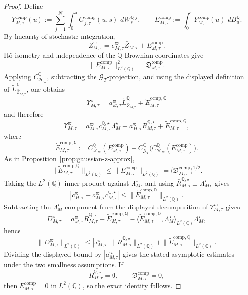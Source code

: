 \documentclass[11pt,a4paper]{amsart}
\theoremstyle{plain}
\theoremstyle{definition}
\theoremstyle{remark}
\newcommand{\QQ}{\mathbb{Q}}
\newcommand{\cG}{\mathcal{G}}
\newcommand{\cH}{\mathcal{H}}
\newcommand{\dd}{\,d}
\begin{document}
\begin{proof}
Define
\[
        Y_{M,\tau}^{\mathrm{comp}}(u)
        :=
        \sum_{j=1}^N \int_0^u G_{j,\tau}^{\mathrm{comp}}(u,s)\,\dd W_s^{\QQ,j},
        \qquad
        E_{M,\tau}^{\mathrm{comp}}
        :=
        \int_0^\tau Y_{M,\tau}^{\mathrm{comp}}(u)\,\dd B_u^\QQ.
\]
By linearity of stochastic integration,
\[
        Z_{M,\tau}^\varpi
        =
        a_{M,\tau}^\varpi \bar Z_{M,\tau}
        +
        E_{M,\tau}^{\mathrm{comp}}.
\]
It\^o isometry and independence of the \(\QQ\)-Brownian coordinates give
\[
        \|E_{M,\tau}^{\mathrm{comp}}\|_{L^2(\QQ)}^2
        =
        \mathfrak D_{M,\tau}^{\mathrm{comp}}.
\]
Applying \(C_{\cH_\varpi}^\QQ\), subtracting the \(\cG_T\)-projection, and using the displayed
definition of \(\widetilde L_{\bar Z_{M,\tau}}^\QQ\), one obtains
\[
        \Upsilon_{M,\tau}^\varpi
        =
        a_{M,\tau}^\varpi \widetilde L_{\bar Z_{M,\tau}}^\QQ
        +
        \widetilde E_{M,\tau}^{\mathrm{comp},\QQ}
\]
and therefore
\[
        \Upsilon_{M,\tau}^\varpi
        =
        a_{M,\tau}^\varpi \bar c_{M,\tau}^{\QQ,\star}\Lambda_M^\star
        +
        a_{M,\tau}^\varpi \bar R_{M,\tau}^{\QQ,\star}
        +
        \widetilde E_{M,\tau}^{\mathrm{comp},\QQ},
\]
where
\[
        \widetilde E_{M,\tau}^{\mathrm{comp},\QQ}
        :=
        C_{\cH_\varpi}^\QQ(E_{M,\tau}^{\mathrm{comp}})
        -
        C_{\cG_T}^\QQ\bigl(C_{\cH_\varpi}^\QQ(E_{M,\tau}^{\mathrm{comp}})\bigr).
\]
As in Proposition~\ref{prop:gaussian-z-approx},
\[
        \|\widetilde E_{M,\tau}^{\mathrm{comp},\QQ}\|_{L^2(\QQ)}
        \le
        \|E_{M,\tau}^{\mathrm{comp}}\|_{L^2(\QQ)}
        =
        \bigl(\mathfrak D_{M,\tau}^{\mathrm{comp}}\bigr)^{1/2}.
\]
Taking the \(L^2(\QQ)\)-inner product against \(\Lambda_M^\star\), and using
\(
        \bar R_{M,\tau}^{\QQ,\star}\perp\Lambda_M^\star,
\)
gives
\[
        \left|
                c_{M,\tau}^\varpi
                -
                a_{M,\tau}^\varpi \bar c_{M,\tau}^{\QQ,\star}
        \right|
        \le
        \|\widetilde E_{M,\tau}^{\mathrm{comp},\QQ}\|_{L^2(\QQ)}.
\]
Subtracting the \(\Lambda_M^\star\)-component from the displayed decomposition of
\(\Upsilon_{M,\tau}^\varpi\) gives
\[
        D_{M,\tau}^\varpi
        =
        a_{M,\tau}^\varpi \bar R_{M,\tau}^{\QQ,\star}
        +
        \widetilde E_{M,\tau}^{\mathrm{comp},\QQ}
        -
        \langle \widetilde E_{M,\tau}^{\mathrm{comp},\QQ},\Lambda_M^\star\rangle_{L^2(\QQ)}
        \Lambda_M^\star,
\]
hence
\[
        \|D_{M,\tau}^\varpi\|_{L^2(\QQ)}
        \le
        |a_{M,\tau}^\varpi|\,\|\bar R_{M,\tau}^{\QQ,\star}\|_{L^2(\QQ)}
        +
        \|\widetilde E_{M,\tau}^{\mathrm{comp},\QQ}\|_{L^2(\QQ)}.
\]
Dividing the displayed bound by \(|a_{M,\tau}^\varpi|\) gives the stated asymptotic estimates under
the two smallness assumptions.  If
\[
        \bar R_{M,\tau}^{\QQ,\star}=0,
        \qquad
        \mathfrak D_{M,\tau}^{\mathrm{comp}}=0,
\]
then \(E_{M,\tau}^{\mathrm{comp}}=0\) in \(L^2(\QQ)\), so the exact identity follows.
\end{proof}
\end{document}
